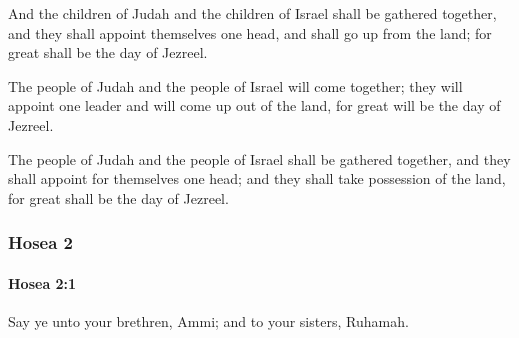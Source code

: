 			\begin{versebox}
					\item[BHS] 
					\item[LXX] 
					\item[ASV] And the children of Judah and the children of Israel shall be gathered together, and they shall appoint themselves one head, and shall go up from the land; for great shall be the day of Jezreel.
					\item[NIV] The people of Judah and the people of Israel will come together; they will appoint one leader and will come up out of the land, for great will be the day of Jezreel.
					\item[NRSV] The people of Judah and the people of Israel shall be gathered together, and they shall appoint for themselves one head; and they shall take possession of the land, for great shall be the day of Jezreel.
			\end{versebox}
	\subsubsection{Hosea 2} %
		\label{HOSEA-2}

		\paragraph{Hosea 2:1} %
			\label{HOSEA-2-1}

			Say ye unto your brethren, Ammi; and to your sisters, Ruhamah.


